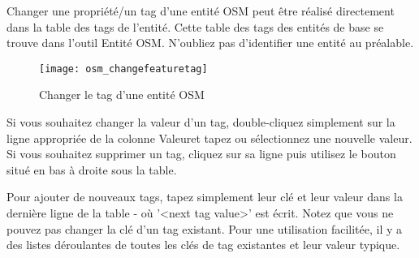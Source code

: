 Changer une propriété/un tag d'une entité OSM peut être réalisé directement dans la table des tags de l'entité. Cette table des tags des entités de base se trouve dans l'outil Entité OSM. N'oubliez pas d'identifier une entité au préalable.

\begin{figure}[ht]
   \centering
   \texttt{[image: osm\_changefeaturetag]}
   \caption{Changer le tag d'une entité OSM \nixcaption}\label{fig:osmchfeattag}
\end{figure}

Si vous souhaitez changer la valeur d'un tag, double-cliquez simplement sur la ligne appropriée de la colonne \og Valeur\fg et tapez ou sélectionnez une nouvelle valeur. Si vous souhaitez supprimer un tag, cliquez sur sa ligne puis utilisez le bouton  situé en bas à droite sous la table.

Pour ajouter de nouveaux tags, tapez simplement leur clé et leur valeur dans la dernière ligne de la table - où '<next tag value>' est écrit. Notez que vous ne pouvez pas changer la clé d'un tag existant. Pour une utilisation facilitée, il y a des listes déroulantes de toutes les clés de tag existantes et leur valeur typique.


